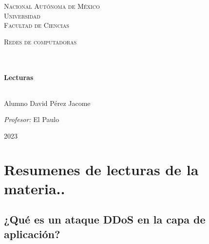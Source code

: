 \documentclass[14pt]{book}
\begin{document}
\begin{center}
\begin{minipage}{0.48\textwidth}
\begin{flushright}
    \end{flushright}
  \end{minipage}
  \vspace*{-1.5cm}
  \textsc{\huge Nacional Autónoma de México \\ \vspace{-4px} Universidad }\\[2cm]
  \textsc{\LARGE Facultad de Ciencias}\\[1.5cm]
  \begin{minipage}{0.9\textwidth}
    \begin{center}
      \textsc{\LARGE Redes de computadoras}
    \end{center}
  \end{minipage}\\[0.5cm]
  \vspace*{1cm}
  \HRule \\[0.4cm]
  { \huge \bfseries Lecturas}\\[0.4cm]
  \HRule \\[1.5cm]
  \begin{minipage}{0.52\textwidth}
    \begin{flushleft} \large \small \vspace{-0.6cm} \vspace{-0.6cm}
      Alumno David Pérez Jacome \\
    \end{flushleft}
  \end{minipage}
  \begin{minipage}{0.46\textwidth}
    \vspace{-0.6cm}
    \begin{flushright} \large \small \emph{Profesor:}
      El Paulo \\
    \end{flushright}
  \end{minipage}
  \vspace*{1cm}
  \vspace{2cm}
  \begin{center}
    {\large 2023}
  \end{center}
\end{center}
\newpage

{\color{blue} \section*{\textbf{Resumenes de lecturas de la materia..}}}
\vspace{1em}

{\color{red} \subsection*{\textbf{¿Qué es un ataque DDoS en la capa de aplicación?}}}
\vspace{1em}
\end{document}
